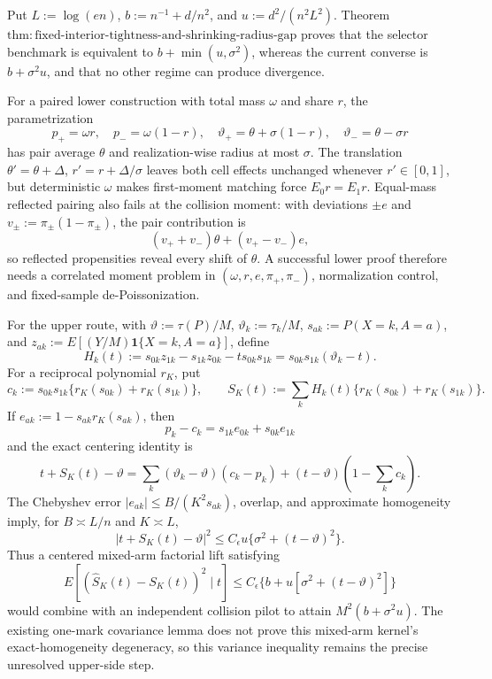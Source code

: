 Put \(L:=\log(en)\), \(b:=n^{-1}+d/n^2\), and \(u:=d^2/(n^2L^2)\).  Theorem~\(\mathrm{thm:fixed\text{-}interior\text{-}tightness\text{-}and\text{-}shrinking\text{-}radius\text{-}gap}\) proves that the selector benchmark is equivalent to \(b+\min(u,\sigma^2)\), whereas the current converse is \(b+\sigma^2u\), and that no other regime can produce divergence.

For a paired lower construction with total mass \(\omega\) and share \(r\), the parametrization
\[
 p_+=\omega r,\quad p_-=\omega(1-r),\quad
 \vartheta_+=\theta+\sigma(1-r),\quad
 \vartheta_-=\theta-\sigma r
\]
has pair average \(\theta\) and realization-wise radius at most \(\sigma\).  The translation \(\theta'=\theta+\Delta\), \(r'=r+\Delta/\sigma\) leaves both cell effects unchanged whenever \(r'\in[0,1]\), but deterministic \(\omega\) makes first-moment matching force \(E_0r=E_1r\).  Equal-mass reflected pairing also fails at the collision moment: with deviations \(\pm e\) and \(v_\pm:=\pi_\pm(1-\pi_\pm)\), the pair contribution is
\[
 (v_++v_-)\theta+(v_+-v_-)e,
\]
so reflected propensities reveal every shift of \(\theta\).  A successful lower proof therefore needs a correlated moment problem in \((\omega,r,e,\pi_+,\pi_-)\), normalization control, and fixed-sample de-Poissonization.

For the upper route, with \(\vartheta:=\tau(P)/M\), \(\vartheta_k:=\tau_k/M\), \(s_{ak}:=P(X=k,A=a)\), and \(z_{ak}:=E[(Y/M)\mathbf1\{X=k,A=a\}]\), define
\[
 H_k(t):=s_{0k}z_{1k}-s_{1k}z_{0k}-ts_{0k}s_{1k}
 =s_{0k}s_{1k}(\vartheta_k-t).
\]
For a reciprocal polynomial \(r_K\), put
\[
 c_k:=s_{0k}s_{1k}\{r_K(s_{0k})+r_K(s_{1k})\},\qquad
 S_K(t):=\sum_kH_k(t)\{r_K(s_{0k})+r_K(s_{1k})\}.
\]
If \(e_{ak}:=1-s_{ak}r_K(s_{ak})\), then
\[
 p_k-c_k=s_{1k}e_{0k}+s_{0k}e_{1k}
\]
and the exact centering identity is
\[
 t+S_K(t)-\vartheta
 =\sum_k(\vartheta_k-\vartheta)(c_k-p_k)
 +(t-\vartheta)\left(1-\sum_kc_k\right).
\]
The Chebyshev error \(|e_{ak}|\le B/(K^2s_{ak})\), overlap, and approximate homogeneity imply, for \(B\asymp L/n\) and \(K\asymp L\),
\[
 |t+S_K(t)-\vartheta|^2
 \le C_\epsilon u\{\sigma^2+(t-\vartheta)^2\}.
\]
Thus a centered mixed-arm factorial lift satisfying
\[
 E[(\widehat S_K(t)-S_K(t))^2\mid t]
 \le C_\epsilon\{b+u[\sigma^2+(t-\vartheta)^2]\}
\]
would combine with an independent collision pilot to attain \(M^2(b+\sigma^2u)\).  The existing one-mark covariance lemma does not prove this mixed-arm kernel's exact-homogeneity degeneracy, so this variance inequality remains the precise unresolved upper-side step.